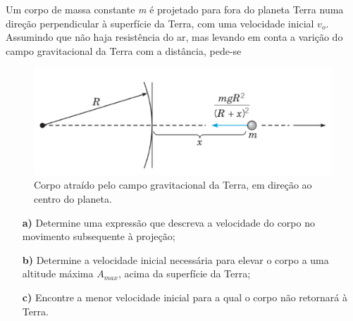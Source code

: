 \linespread{1.5}
Um corpo de massa constante \textit{m} é projetado para fora do planeta Terra numa direção perpendicular à superfície da Terra, com uma velocidade inicial $v_o$. Assumindo que não haja resistência do ar, mas levando em conta a varição do campo gravitacional da Terra com a distância, pede-se
\begin{figure}[H]
    \centering
    \includegraphics[width=0.7\linewidth]{fig/edo24.png}
    \caption{Corpo atraído pelo campo gravitacional da Terra, em direção ao centro do planeta.}
    \label{fig:edo24}
\end{figure}

\begin{itemize}
    \item[\textbf{a)}] Determine uma expressão que descreva a velocidade do corpo no movimento subsequente à projeção;
    \item[\textbf{b)}]Determine a velocidade inicial necessária para elevar o corpo a uma altitude máxima $A_{max}$, acima da superfície da Terra;
    \item[\textbf{c)}] Encontre a menor velocidade inicial para a qual o corpo não retornará à Terra.
\end{itemize}
